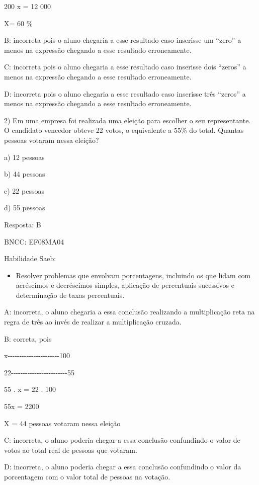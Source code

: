 200 x = 12 000

X= 60 \%

B: incorreta pois o aluno chegaria a esse resultado caso inserisse um
``zero'' a menos na expressão chegando a esse resultado erroneamente.

C: incorreta pois o aluno chegaria a esse resultado caso inserisse dois
``zeros'' a menos na expressão chegando a esse resultado erroneamente.

D: incorreta pois o aluno chegaria a esse resultado caso inserisse três
``zeros'' a menos na expressão chegando a esse resultado erroneamente.

2) Em uma empresa foi realizada uma eleição para escolher o seu
representante. O candidato vencedor obteve 22 votos, o equivalente a
55\% do total. Quantas pessoas votaram nessa eleição?

a) 12 pessoas

b) 44 pessoas

c) 22 pessoas

d) 55 pessoas

Resposta: B

BNCC: EF08MA04

Habilidade Saeb:

\begin{itemize}
\tightlist
\item
  Resolver problemas que envolvam porcentagens, incluindo os que lidam
  com acréscimos e decréscimos simples, aplicação de percentuais
  sucessivos e determinação de taxas percentuais.
\end{itemize}

A: incorreta, o aluno chegaria a essa conclusão realizando a
multiplicação reta na regra de três ao invés de realizar a multiplicação
cruzada.

B: correta, pois

x-\/-\/-\/-\/-\/-\/-\/-\/-\/-\/-\/-\/-\/-\/-\/-\/-\/-\/-\/-\/-\/-100

22-\/-\/-\/-\/-\/-\/-\/-\/-\/-\/-\/-\/-\/-\/-\/-\/-\/-\/-\/-\/-\/-\/-\/-55

55 . x = 22 . 100

55x = 2200

X = 44 pessoas votaram nessa eleição

C: incorreta, o aluno poderia chegar a essa conclusão confundindo o
valor de votos ao total real de pessoas que votaram.

D: incorreta, o aluno poderia chegar a essa conclusão confundindo o
valor da porcentagem com o valor total de pessoas na votação.

